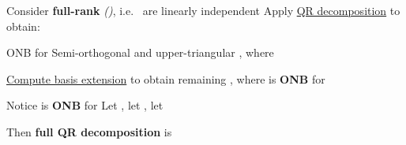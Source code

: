 \begin{itemize}

      \vItem
            Consider \textbf{full-rank}
            \emph{()},
            i.e.~
            are linearly independent
      \vItem
            Apply \underline{QR decomposition} to obtain:

            \begin{itemize}

                  \vItem
                        ONB
                        for 
                  \vItem
                        Semi-orthogonal
                        and upper-triangular ,
                        where 
            \end{itemize}
      \vItem
            \underline{Compute basis extension} to obtain remaining
            ,
            where 
            is \textbf{ONB} for 

            \begin{itemize}

                  \vItem
                        Notice
                         is
                        \textbf{ONB} for 
                  \vItem
                        Let
                        ,
                        let , let
            \end{itemize}
      \vItem
            Then \textbf{full QR decomposition} is


\end{itemize}
